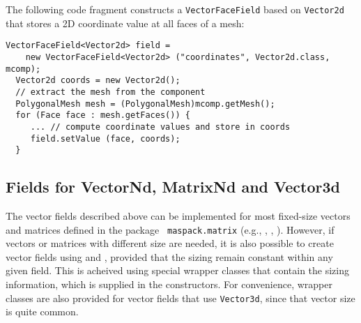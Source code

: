 The following code fragment constructs a {\tt VectorFaceField} based
on {\tt Vector2d} that stores a 2D coordinate value at all faces
of a mesh:
%
\begin{lstlisting}[]
  VectorFaceField<Vector2d> field =
    new VectorFaceField<Vector2d> ("coordinates", Vector2d.class, mcomp);
  Vector2d coords = new Vector2d();
  // extract the mesh from the component
  PolygonalMesh mesh = (PolygonalMesh)mcomp.getMesh();
  for (Face face : mesh.getFaces()) {
     ... // compute coordinate values and store in coords
     field.setValue (face, coords);
  }
\end{lstlisting}
%

\subsection{Fields for VectorNd, MatrixNd and Vector3d}
\label{sec:wrapperFields}

The vector fields described above can be implemented for most
fixed-size vectors and matrices defined in the package {\tt
maspack.matrix} (e.g.,
,
,
).
However, if vectors or matrices with different size are needed,
it is also possible to create vector fields using
 and
, provided that the
sizing remain constant within any given field. This is acheived
using special wrapper classes that contain the sizing information,
which is supplied in the constructors. For convenience, wrapper
classes are also provided for vector fields that use {\tt Vector3d},
since that vector size is quite common.


